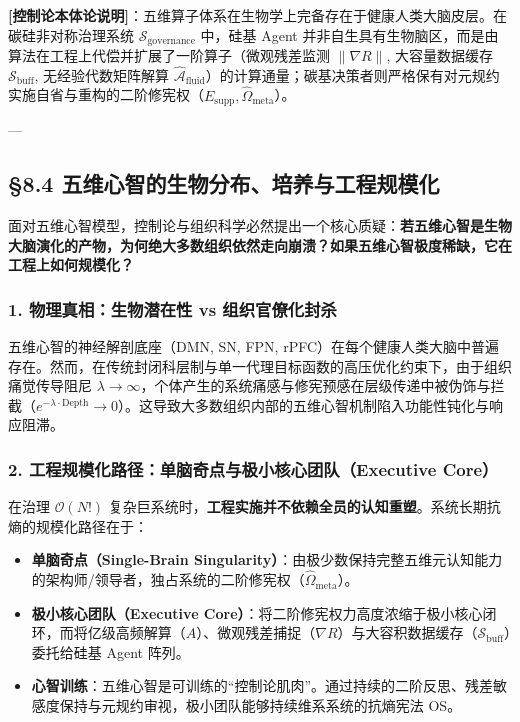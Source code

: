 \documentclass[11pt,a4paper,oneside]{ctexart}
\begin{document}
\begin{notebox}
\textbf{[控制论本体论说明]}：五维算子体系在生物学上完备存在于健康人类大脑皮层。在碳硅非对称治理系统 $\mathcal{S}_{\text{governance}}$ 中，硅基 Agent 并非自生具有生物脑区，而是由算法在工程上代偿并扩展了一阶算子（微观残差监测 $\|\nabla R\|$, 大容量数据缓存 $\mathcal{S}_{\text{buff}}$, 无经验代数矩阵解算 $\hat{\mathcal{A}}_{\text{fluid}}$）的计算通量；碳基决策者则严格保有对元规约实施自省与重构的二阶修宪权（$E_{\text{supp}}, \hat{\Omega}_{\text{meta}}$）。
\end{notebox}

---


\subsection{§8.4 五维心智的生物分布、培养与工程规模化}

面对五维心智模型，控制论与组织科学必然提出一个核心质疑：\textbf{若五维心智是生物大脑演化的产物，为何绝大多数组织依然走向崩溃？如果五维心智极度稀缺，它在工程上如何规模化？}


\subsubsection{1. 物理真相：生物潜在性 vs 组织官僚化封杀}
五维心智的神经解剖底座（DMN, SN, FPN, rPFC）在每个健康人类大脑中普遍存在。然而，在传统封闭科层制与单一代理目标函数的高压优化约束下，由于组织痛觉传导阻尼 $\lambda \to \infty$，个体产生的系统痛感与修宪预感在层级传递中被伪饰与拦截（$e^{-\lambda \cdot \text{Depth}} \to 0$）。这导致大多数组织内部的五维心智机制陷入功能性钝化与响应阻滞。


\subsubsection{2. 工程规模化路径：单脑奇点与极小核心团队（Executive Core）}
在治理 $\mathcal{O}(N!)$ 复杂巨系统时，\textbf{工程实施并不依赖全员的认知重塑}。系统长期抗熵的规模化路径在于：

\begin{itemize}\item \textbf{单脑奇点（Single-Brain Singularity）}：由极少数保持完整五维元认知能力的架构师/领导者，独占系统的二阶修宪权（$\hat{\Omega}_{\text{meta}}$）。\end{itemize}
\begin{itemize}\item \textbf{极小核心团队（Executive Core）}：将二阶修宪权力高度浓缩于极小核心闭环，而将亿级高频解算（$A$）、微观残差捕捉（$\nabla R$）与大容积数据缓存（$\mathcal{S}_{\text{buff}}$）委托给硅基 Agent 阵列。\end{itemize}
\begin{itemize}\item \textbf{心智训练}：五维心智是可训练的“控制论肌肉”。通过持续的二阶反思、残差敏感度保持与元规约审视，极小团队能够持续维系系统的抗熵宪法 OS。\end{itemize}
\end{document}

